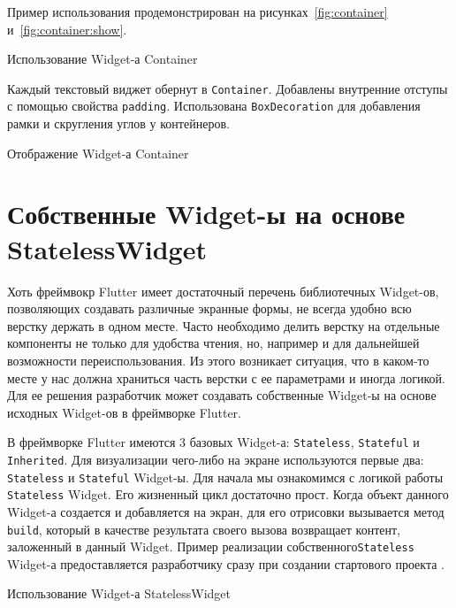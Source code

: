 Пример использования продемонстрирован
на рисунках~\ref{fig:container} и~\ref{fig:container:show}.

\begin{image}
	\caption{Использование Widget-а Container}
	\label{fig:container}
\end{image}

\clearpage
Каждый текстовый виджет обернут в \texttt{Container}.
Добавлены внутренние отступы с помощью свойства \texttt{padding}.
Использована \texttt{BoxDecoration} для добавления рамки
и скругления углов у контейнеров.

\begin{image}
	\caption{Отображение Widget-а Container}
	\label{fig:container:show}
\end{image}

\section{Собственные Widget-ы на основе StatelessWidget}

Хоть фреймвокр Flutter имеет достаточный перечень библиотечных Widget-ов,
позволяющих создавать различные экранные формы,
не всегда удобно всю верстку держать в одном месте.
Часто необходимо делить верстку на отдельные компоненты не только
для удобства чтения, но,
например и для дальнейшей возможности переиспользования.
Из этого возникает ситуация,
что в каком-то месте у нас должна храниться часть верстки с ее параметрами
и иногда логикой.
Для ее решения разработчик может создавать собственные
Widget-ы на основе исходных Widget-ов в фреймворке Flutter.\par
В фреймворке Flutter имеются 3 базовых Widget-а:
\texttt{Stateless}, \texttt{Stateful} и \texttt{Inherited}.
Для визуализации чего-либо на экране используются первые два:
\texttt{Stateless} и \texttt{Stateful} Widget-ы.
Для начала мы ознакомимся с логикой работы \texttt{Stateless} Widget.
Его жизненный цикл достаточно прост.
Когда объект данного Widget-а создается и добавляется на экран,
для его отрисовки вызывается метод \texttt{build},
который в качестве результата своего вызова возвращает контент,
заложенный в данный Widget.
Пример реализации собственного\texttt{Stateless} Widget-а 
предоставляется разработчику сразу при создании стартового проекта
.

\begin{image}
	\caption{Использование Widget-а StatelessWidget}
	\label{fig:stateless}
\end{image}

